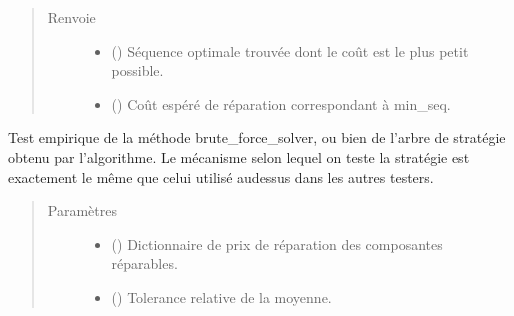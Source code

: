 \documentclass[letterpaper,10pt,french]{sphinxmanual}
\begin{document}
\begin{fulllineitems}
\begin{fulllineitems}
\begin{quote}
\begin{description}
\item[{Renvoie}] \leavevmode
\begin{itemize}
\item {} 
 () \textendash{} Séquence optimale trouvée dont le coût est le plus petit possible.

\item {} 
 () \textendash{} Coût espéré de réparation correspondant à min\_seq.

\end{itemize}


\end{description}\end{quote}

\end{fulllineitems}


\begin{fulllineitems}
\label{\detokenize{index:DecisionTheoreticTroubleshooting.TroubleShootingProblem.brute_force_solver_tester}}
Test empirique de la méthode brute\_force\_solver, ou bien de l’arbre de
stratégie obtenu par l’algorithme. Le mécanisme selon lequel on teste
la stratégie est exactement le même que celui utilisé au\sphinxhyphen{}dessus
dans les autres testers.
\begin{quote}\begin{description}
\item[{Paramètres}] \leavevmode\begin{itemize}
\item {} 
 () \textendash{} Dictionnaire de prix de réparation des composantes réparables.

\item {} 
 () \textendash{} Tolerance relative de la moyenne.


\end{itemize}
\end{description}
\end{quote}
\end{fulllineitems}
\end{fulllineitems}
\end{document}
